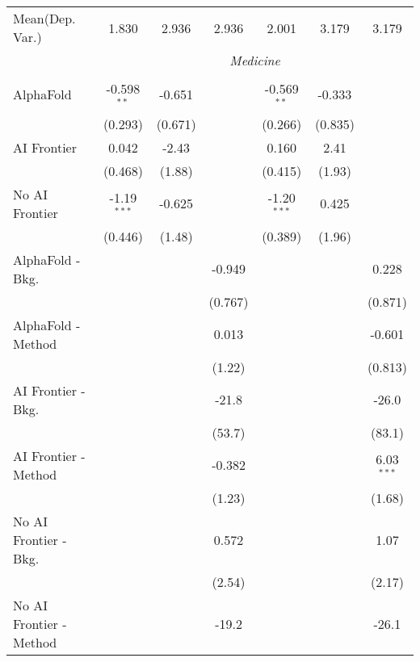 \begin{tabular}{lcccccc}
Mean(Dep. Var.) & 1.830 & 2.936 & 2.936 & 2.001 & 3.179 & 3.179 \\
 & \multicolumn{6}{c}{\textit{Medicine}} \\ \\
   AlphaFold               & -0.598$^{**}$ & -0.651  &         & -0.569$^{**}$ & -0.333  &   \\   
                           & (0.293)       & (0.671) &         & (0.266)       & (0.835) &   \\   
   AI Frontier             & 0.042         & -2.43   &         & 0.160         & 2.41    &   \\   
                           & (0.468)       & (1.88)  &         & (0.415)       & (1.93)  &   \\   
   No AI Frontier          & -1.19$^{***}$ & -0.625  &         & -1.20$^{***}$ & 0.425   &   \\   
                           & (0.446)       & (1.48)  &         & (0.389)       & (1.96)  &   \\   
   AlphaFold - Bkg.        &               &         & -0.949  &               &         & 0.228\\   
                           &               &         & (0.767) &               &         & (0.871)\\   
   AlphaFold - Method      &               &         & 0.013   &               &         & -0.601\\   
                           &               &         & (1.22)  &               &         & (0.813)\\   
   AI Frontier - Bkg.      &               &         & -21.8   &               &         & -26.0\\   
                           &               &         & (53.7)  &               &         & (83.1)\\   
   AI Frontier - Method    &               &         & -0.382  &               &         & 6.03$^{***}$\\   
                           &               &         & (1.23)  &               &         & (1.68)\\   
   No AI Frontier - Bkg.   &               &         & 0.572   &               &         & 1.07\\   
                           &               &         & (2.54)  &               &         & (2.17)\\   
   No AI Frontier - Method &               &         & -19.2   &               &         & -26.1\\   

\end{tabular}
